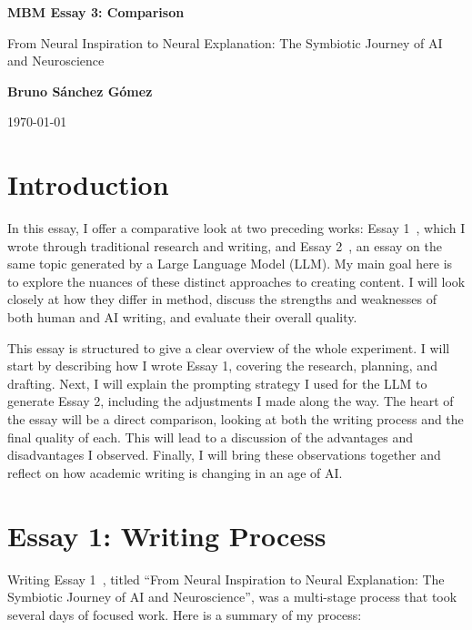 \documentclass[11pt,a4paper]{article}
\author{Bruno Sánchez Gómez}
\date{\today}
\begin{document}
\begin{titlepage}
    \centering
    \vspace*{2cm}
    {\Huge \bfseries MBM Essay 3: Comparison \par}
    \vspace{2cm}
    {\huge From Neural Inspiration to Neural Explanation: The Symbiotic Journey of AI and Neuroscience \par}
    \vspace{10cm}
    {\large \textbf{Bruno Sánchez Gómez} \par}
    \vfill
    {\large \today \par}
\end{titlepage}

\section{Introduction}

In this essay, I offer a comparative look at two preceding works: Essay 1~\cite{essay1}, which I wrote through traditional research and writing, and Essay 2~\cite{essay2}, an essay on the same topic generated by a Large Language Model (LLM). My main goal here is to explore the nuances of these distinct approaches to creating content. I will look closely at how they differ in method, discuss the strengths and weaknesses of both human and AI writing, and evaluate their overall quality.

This essay is structured to give a clear overview of the whole experiment. I will start by describing how I wrote Essay 1, covering the research, planning, and drafting. Next, I will explain the prompting strategy I used for the LLM to generate Essay 2, including the adjustments I made along the way. The heart of the essay will be a direct comparison, looking at both the writing process and the final quality of each. This will lead to a discussion of the advantages and disadvantages I observed. Finally, I will bring these observations together and reflect on how academic writing is changing in an age of AI.

\section{Essay 1: Writing Process}

Writing Essay 1~\cite{essay1}, titled ``From Neural Inspiration to Neural Explanation: The Symbiotic Journey of AI and Neuroscience'', was a multi-stage process that took several days of focused work. Here is a summary of my process:
\end{document}

